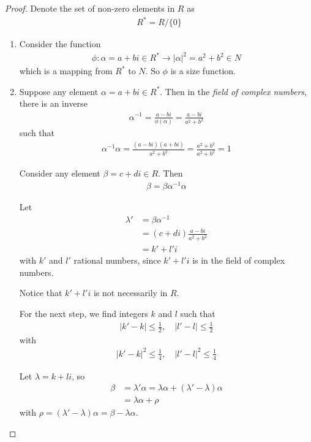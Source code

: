 \documentclass[utf8]{ctexbook}
\theoremstyle{definition}
\begin{document}
\begin{proof}
Denote the set of non-zero elements in $R$ as
\begin{align*}
R^*= R / \{ 0\}
\end{align*}
\begin{enumerate}
\item{Consider the function
\begin{align*}
\phi: \alpha = a + bi \in R^* \longrightarrow |\alpha|^2 = a^2 + b^2 \in N
\end{align*}
which is a mapping from $R^* $ to $N$. So $\phi$ is a size function.
}
\item{Suppose any element $\alpha = a + bi \in R^*$. Then in the \emph{field of complex numbers}, there is an inverse
\begin{align*}
\alpha^{-1} = \frac{a-bi}{\phi(\alpha) } = \frac{a - b i}{a^2 + b^2}
\end{align*}
such that
\begin{align*}
\alpha^{-1} \alpha = \frac{(a - b i)(a + b i)}{a^2 + b^2} = \frac{a^2 + b^2}{a^2 + b^2} = 1
\end{align*}

Consider any element $\beta = c + di \in R$. Then 
\begin{align*}
\beta = \beta \alpha^{-1} \alpha 
\end{align*}

Let
\begin{align*}
\lambda' &= \beta \alpha^{-1} \\
&= (c+ di) \frac{a - b i}{a^2 + b^2} \\
&= k' + l' i
\end{align*}
with $k'$ and $l'$ rational numbers, since $k' + l' i$ is in the field of complex numbers.

Notice that $k' + l' i$ is not necessarily in $R$.

For the next step, we find integers $k$ and $l$ such that
\begin{align*}
| k' - k | \leq \frac{1}{2}, \quad | l' - l | \leq \frac{1}{2}
\end{align*}
with
\begin{align*}
| k' - k |^2 \leq \frac{1}{4}, \quad | l' - l |^2 \leq \frac{1}{4}
\end{align*}

Let $\lambda = k + l i$, so
\begin{align*}
\beta & = \lambda' \alpha = \lambda \alpha + (\lambda' - \lambda) \alpha \\
& = \lambda \alpha + \rho
\end{align*}
with $\rho = (\lambda' - \lambda) \alpha = \beta - \lambda \alpha$.

}
\end{enumerate}
\end{proof}
\end{document}
